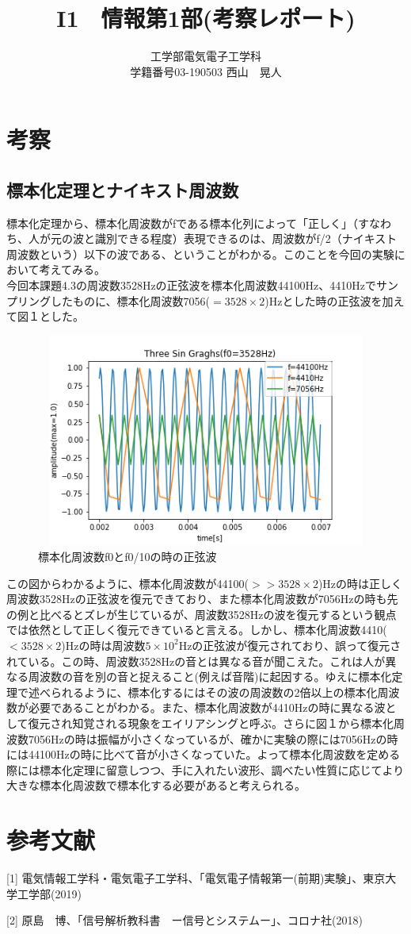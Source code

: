 \documentclass{jsarticle}
\title{I1　情報第1部(考察レポート)}
\author{工学部電気電子工学科　\\
学籍番号03-190503 西山　晃人}
\date{}
\begin{document}
\maketitle

\section{考察}
\subsection{標本化定理とナイキスト周波数}
標本化定理から、標本化周波数がfである標本化列によって「正しく」（すなわち、人が元の波と識別できる程度）表現できるのは、周波数がf/2（ナイキスト周波数という）以下の波である、ということがわかる。このことを今回の実験において考えてみる。\\

今回本課題4.3の周波数3528Hzの正弦波を標本化周波数44100Hz、4410Hzでサンプリングしたものに、標本化周波数7056($=3528\times 2$)Hzとした時の正弦波を加えて図１とした。\\

\begin{figure}[htbp]
   \centering
   \includegraphics[height=70mm, width=150mm]{figures/two_sin_graghs.png}
 \caption{標本化周波数f0とf0/10の時の正弦波}
\end{figure}

この図からわかるように、標本化周波数が44100($>>3528\times 2$)Hzの時は正しく周波数3528Hzの正弦波を復元できており、また標本化周波数が7056Hzの時も先の例と比べるとズレが生じているが、周波数3528Hzの波を復元するという観点では依然として正しく復元できていると言える。しかし、標本化周波数4410($< 3528\times 2$)Hzの時は周波数$5\times 10^2$Hzの正弦波が復元されており、誤って復元されている。この時、周波数3528Hzの音とは異なる音が聞こえた。これは人が異なる周波数の音を別の音と捉えること(例えば音階)に起因する。ゆえに標本化定理で述べられるように、標本化するにはその波の周波数の2倍以上の標本化周波数が必要であることがわかる。また、標本化周波数が4410Hzの時に異なる波として復元され知覚される現象をエイリアシングと呼ぶ。さらに図１から標本化周波数7056Hzの時は振幅が小さくなっているが、確かに実験の際には7056Hzの時には44100Hzの時に比べて音が小さくなっていた。よって標本化周波数を定める際には標本化定理に留意しつつ、手に入れたい波形、調べたい性質に応じてより大きな標本化周波数で標本化する必要があると考えられる。

\section{参考文献}
[1] 電気情報工学科・電気電子工学科、「電気電子情報第一(前期)実験」、東京大学工学部(2019)

[2] 原島　博、「信号解析教科書　ー信号とシステムー」、コロナ社(2018)
\\
\end{document}
